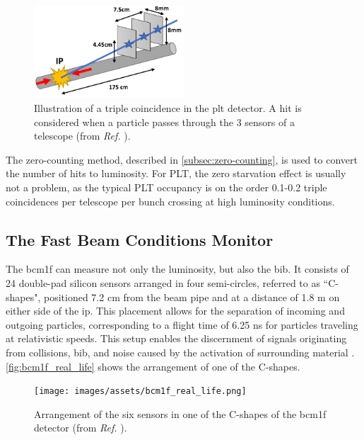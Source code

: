\begin{figure}[H]
	\centering
	\includegraphics[width=0.5\textwidth]{images/assets/TripleCoincidenceSketch.pdf}
	\caption[Triple coincidence in PLT]{Illustration of a triple coincidence in the \acrshort{plt} detector. A hit is considered when a particle passes through the 3 sensors of a telescope (from \textit{Ref.} \cite{Lujan:2797692}).}
	\label{fig:plt_triple_coincidence}
\end{figure}

The zero-counting method, described in \autoref{subsec:zero-counting}, is used to convert the number of hits to luminosity. For PLT, the zero starvation effect is usually not a problem, as the typical PLT occupancy is on the order 0.1-0.2 triple coincidences per telescope per bunch crossing at high luminosity conditions.

\subsection{The Fast Beam Conditions Monitor}

The \acrfull{bcm1f} \cite{CMS-DP-2022-033} can measure not only the luminosity, but also the \acrshort{bib}. It consists of 24 double-pad silicon sensors arranged in four semi-circles, referred to as ``C-shapes", positioned 7.2 cm from the beam pipe and at a distance of 1.8 m on either side of the \acrshort{ip}. This placement allows for the separation of incoming and outgoing particles, corresponding to a flight time of 6.25 ns for particles traveling at relativistic speeds. This setup enables the discernment of signals originating from collisions, \acrshort{bib}, and noise caused by the activation of surrounding material \cite{Zagozdzinska_2016}. \autoref{fig:bcm1f_real_life} shows the arrangement of one of the C-shapes.

\begin{figure}[h]
\centering
\texttt{[image: images/assets/bcm1f\_real\_life.png]}
\caption[BCM1F sensor arrangement]{Arrangement of the six sensors in one of the C-shapes of the \acrshort{bcm1f} detector (from \textit{Ref.} \cite{DelannoySotomayor:2809025}).}
\label{fig:bcm1f_real_life}
\end{figure}

